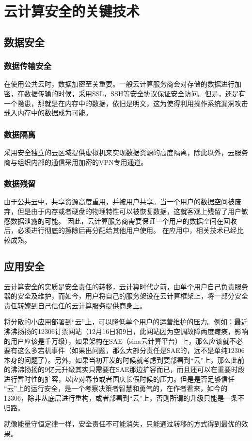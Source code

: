 \documentclass[a4paper]{ctexart}
\begin{document}
    \section{云计算安全的关键技术}
        \subsection{数据安全}
        \subsubsection{数据传输安全}
            \par 在使用公共云时，数据加密至关重要。一般云计算服务商会对存储的数据进行加密，在数据传输的时候，采用SSL，SSH等安全协议保证安全访问。但是，还是有一个隐患，那就是在内存中的数据，依旧是明文，这为使得利用操作系统漏洞攻击载入内存中的数据成为可能。
        \subsubsection{数据隔离}
            \par 采用安全独立的云区域提供虚拟机来实现数据资源的高度隔离，除此以外，云服务商与组织内部的通信采用加密的VPN专用通道。

        \subsubsection{数据残留}
            {\color{red}
            \par 由于公共云中，共享资源高度重用，并被用户共享。当一个用户的数据空间被废弃，但是由于内存或者硬盘的物理特性可以被恢复数据，这就客观上残留了用户敏感数据泄露的可能。 因此，云计算服务商需要保证一个用户的数据空间在回收后，必须进行彻底的擦除后再分配给其他用户使用。 在应用中，相关技术已经比较成熟。

        \subsection{应用安全}
            \par 云计算安全的实质是安全责任的转移，云计算时代之前，由单个用户自己负责服务器的安全及维护，而如今，用户将自己的服务架设在云计算框架上，将一部分安全责任转嫁到自己信任的云计算服务提供商身上。 
            \par 将分散的小应用部署到“云”上，可以降低单个用户的运营维护的压力。例如：最近沸沸扬扬的12306订票网站（12月16日和9日，此网站因为空调故障两度瘫痪，影响的用户应该是千万级），如果架构在SAE（sina云计算平台）上，那么应该就不必要有这么多宕机事件（如果出问题，那么大部分责任是SAE的，远不是单纯12306本身的问题了）。另外，如果当初开发的时候就考虑到要部署到“云”上，那么此前的沸沸扬扬的9亿元升级其实只需要在SAE那边扩容而已，而且还可以在重要时段进行暂时性的扩容，以应对春节或者国庆长假时候的压力。但是是否足够信任 “云”上的运行安全，是一个考察决策者智慧和勇气的，在作者看来，如今的12306，除非从底层进行重构，或者部署到“云”上，否则所谓的升级只能是一条不归路。
        \par 就像能量守恒定律一样，安全责任不可能消失，只能通过转移的方式得到最优的效果。}
\end{document}
